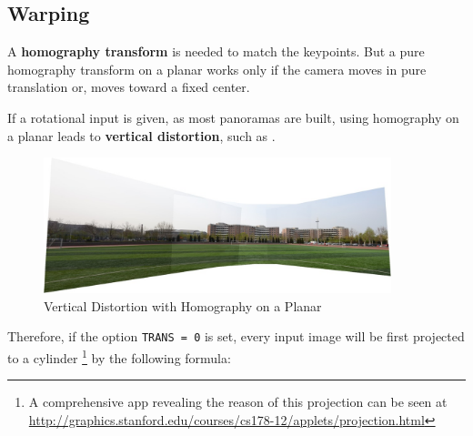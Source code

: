 \begin{enumerate}
    \subsection{Warping}
    A \textbf{homography transform} is needed to match the keypoints.
    But a pure homography transform on a planar works
    only if the camera moves in pure translation or, moves toward a fixed center.

    If a rotational input is given, as most panoramas are built, using homography on a planar leads to \textbf{vertical distortion}, such as .
    \begin{figure}[H]
      \centering
      \includegraphics[width=0.9\textwidth]{res/distort.png}
      \caption{Vertical Distortion with Homography on a Planar\label{fig:distort}}
    \end{figure}

    Therefore, if the option \verb|TRANS = 0| is set,
    every input image will be first projected to a cylinder
    \footnote{A comprehensive app revealing the reason of this projection can be seen at \url{http://graphics.stanford.edu/courses/cs178-12/applets/projection.html}}
    by the following formula:


\end{enumerate}
